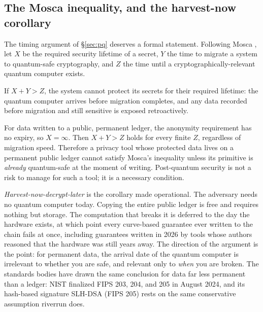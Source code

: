 \documentclass[11pt]{article}
\begin{document}
\subsection{The Mosca inequality, and the harvest-now corollary}

The timing argument of \S\ref{sec:pq} deserves a formal statement. Following Mosca
\cite{mosca}, let $X$ be the required security lifetime of a secret, $Y$ the time to
migrate a system to quantum-safe cryptography, and $Z$ the time until a
cryptographically-relevant quantum computer exists.

\begin{claimx}
If $X + Y > Z$, the system cannot protect its secrets for their required lifetime: the
quantum computer arrives before migration completes, and any data recorded before
migration and still sensitive is exposed retroactively.
\end{claimx}

\begin{claimx}
For data written to a public, permanent ledger, the anonymity requirement has no expiry,
so $X = \infty$. Then $X + Y > Z$ holds for every finite $Z$, regardless of migration
speed. Therefore a privacy tool whose protected data lives on a permanent public ledger
cannot satisfy Mosca's inequality unless its primitive is \emph{already} quantum-safe at
the moment of writing. Post-quantum security is not a risk to manage for such a tool; it
is a necessary condition.
\end{claimx}

\emph{Harvest-now-decrypt-later} is the corollary made operational. The adversary needs
no quantum computer today. Copying the entire public ledger is free and requires nothing
but storage. The computation that breaks it is deferred to the day the hardware exists,
at which point every curve-based guarantee ever written to the chain fails at once,
including guarantees written in 2026 by tools whose authors reasoned that the hardware
was still years away. The direction of the argument is the point: for permanent data, the
arrival date of the quantum computer is irrelevant to whether you are safe, and relevant
only to \emph{when} you are broken. The standards bodies have drawn the same conclusion
for data far less permanent than a ledger: NIST finalized FIPS 203, 204, and 205 in
August 2024, and its hash-based signature SLH-DSA (FIPS 205) rests on the same
conservative assumption riverrun does.

\end{document}
